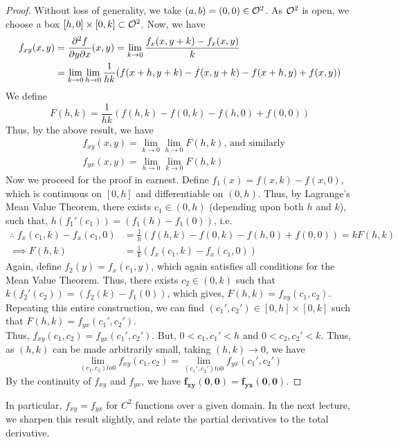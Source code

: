 \documentclass[../Analysis-3.tex]{subfiles}
\begin{document}
\begin{proof}
  Without loss of generality, we take $(a,b) = (0,0) \in \mathcal{O}_{}^2$. As $\mathcal{O}_{}^2$ is open, we choose a box $[h,0]\times [0,k] \subset \mathcal{O}_{}^2$. Now, we have
  \begin{align*}
    f_{xy}(x,y)
     & = \pdv{f}{y}{x}\/(x,y) = \lim_{k \to 0} \frac{f_x(x,y+k) - f_x(x,y)}{k}                \\
     & = \lim_{k \to 0} \lim_{h \to 0} \frac{1}{hk}(f(x+h,y+k) - f(x,y+k) - f(x+h,y)+ f(x,y))
  \end{align*}
  We define
  \[F(h,k) = \frac{1}{hk}(f(h,k) - f(0,k) - f(h,0)+ f(0,0))\]
  Thus, by the above result, we have
  \begin{align*}
     & f_{xy}(x,y) = \lim_{k \to 0} \lim_{h \to 0} F(h,k) \text{, and similarly} \\ &f_{yx}(x,y) = \lim_{h \to 0} \lim_{k \to 0} F(h,k)
  \end{align*}
  Now we proceed for the proof in earnest. Define $f_1(x) = f(x,k) - f(x,0)$, which is continuous on $[0,h]$ and differentiable on $(0,h)$. Thus, by Lagrange's Mean Value Theorem, there exists $c_1 \in (0,h)$ (depending upon both $h$ and $k$), such that, $h(f_1'(c_1)) = (f_1(h) - f_1(0))$, i.e.
  \begin{align*}
    \therefore\; f_x(c_1,k) - f_x(c_1,0) & =  \frac{1}{h}(f(h,k) - f(0,k) - f(h,0)+ f(0,0)) = kF(h,k) \\
    \implies F(h,k)                      & = \frac{1}{k}(f_x(c_1,k) - f_x(c_1,0))
  \end{align*}
  Again, define $f_2(y) = f_x(c_1,y)$, which again satisfies all conditions for the Mean Value Theorem. Thus, there exists $c_2 \in (0,k)$ such that $k(f_2'(c_2)) = (f_2(k) - f_1(0))$, which gives, $F(h,k) = f_{xy}(c_1, c_2)$.\\
  Repeating this entire construction, we can find $(c_1', c_2') \in [0,h]\times[0,k]$ such that $F(h,k) = f_{yx}(c_1', c_2')$.\\
  Thus, $f_{xy}(c_1, c_2) = f_{yx}(c_1', c_2')$. But, $0 < c_1, c_1' < h$ and $0 < c_2, c_2' < k$. Thus, as $(h,k)$ can be made arbitrarily small, taking  $(h,k) \to 0$, we have
  \[
    \lim_{(c_1, c_2) to 0} f_{xy}(c_1, c_2) = \lim_{(c_1', c_2') to 0} f_{yx}(c_1', c_2')
  \]
  By the continuity of $f_{xy}$ and $f_{yx}$, we have $\mathbf{f_{xy}(0,0) = f_{yx}(0,0)}$.

\end{proof}

\msk

In particular, $f_{xy} = f_{yx}$ for $C^2$ functions over a given domain. In the next lecture, we sharpen this result slightly, and relate the  partial derivatives to the total derivative.
\end{document}
